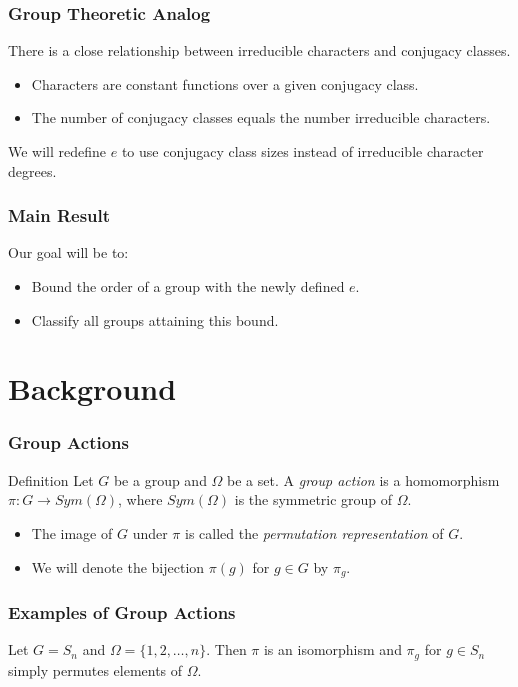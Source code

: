 \documentclass{beamer}
\begin{document}
\begin{frame}
\frametitle{Group Theoretic Analog}
There is a close relationship between irreducible characters and conjugacy classes.
\begin{itemize}
	\item Characters are constant functions over a given conjugacy class.
	\item The number of conjugacy classes equals the number irreducible characters.
\end{itemize}
\pause
We will redefine $e$ to use conjugacy class sizes instead of irreducible character degrees.
\end{frame}

\begin{frame}
\frametitle{Main Result}
Our goal will be to:
\begin{itemize}
	\item Bound the order of a group with the newly defined $e$.
	\item Classify all groups attaining this bound.
\end{itemize}
\end{frame}


\section{Background}

\begin{frame}
\frametitle{Group Actions}
\begin{block}{Definition}
Let $G$ be a group and $\Omega$ be a set. A \emph{group action} is a homomorphism $\pi: G \to Sym(\Omega)$, where $Sym(\Omega)$ is the symmetric group of $\Omega$.
\end{block}
\begin{itemize}
	\item<2-> The image of $G$ under $\pi$ is called the \emph{permutation representation} of $G$.
	\item<3-> We will denote the bijection $\pi(g)$ for $g \in G$ by $\pi_g$.
\end{itemize}
\end{frame}

\begin{frame}
\frametitle{Examples of Group Actions}
Let $G = S_n$ and $\Omega = \{1, 2, \ldots, n\}$. Then $\pi$ is an isomorphism and $\pi_g$ for $g \in S_n$ simply permutes elements of $\Omega$.
\vskip0.5cm
\end{frame}
\end{document}

